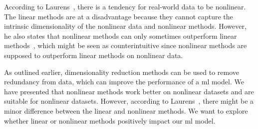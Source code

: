According to Laurens~\cite{dimensionality-reduction-comparative-review}, there is a tendency for real-world data to be nonlinear. The linear methods are at a disadvantage because they cannot capture the intrinsic dimensionality of the nonlinear data and nonlinear methods. However, he also states that nonlinear methods can only sometimes outperform linear methods~\cite{dimensionality-reduction-comparative-review}, which might be seen as counterintuitive since nonlinear methods are supposed to outperform linear methods on nonlinear data. 

As outlined earlier, dimensionality reduction methods can be used to remove redundancy from data, which can improve the performance of a \gls{ml} model. We have presented that nonlinear methods work better on nonlinear datasets and are suitable for nonlinear datasets. However, according to Laurens~\cite{dimensionality-reduction-comparative-review}, there might be a minor difference between the linear and nonlinear methods. We want to explore whether linear or nonlinear methods positively impact our \gls{ml} model. 







